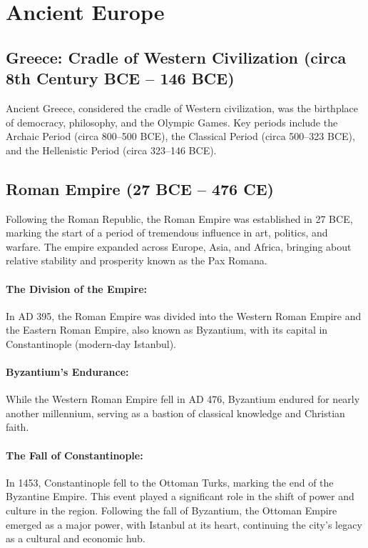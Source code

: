\documentclass{book}
\begin{document}
\section{Ancient Europe}
\label{sec:ancient-europe}
\subsection{Greece: Cradle of Western Civilization (circa 8th Century BCE – 146 BCE)}
Ancient Greece, considered the cradle of Western civilization, was the birthplace of democracy, philosophy, and the Olympic Games. Key periods include the Archaic Period (circa 800–500 BCE), the Classical Period (circa 500–323 BCE), and the Hellenistic Period (circa 323–146 BCE).

\subsection{Roman Empire (27 BCE – 476 CE)}
Following the Roman Republic, the Roman Empire was established in 27 BCE, marking the start of a period of tremendous influence in art, politics, and warfare. The empire expanded across Europe, Asia, and Africa, bringing about relative stability and prosperity known as the Pax Romana.

\paragraph{The Division of the Empire:}
In AD 395, the Roman Empire was divided into the Western Roman Empire and the Eastern Roman Empire, also known as Byzantium, with its capital in Constantinople (modern-day Istanbul).

\paragraph{Byzantium’s Endurance:}
While the Western Roman Empire fell in AD 476, Byzantium endured for nearly another millennium, serving as a bastion of classical knowledge and Christian faith.

\paragraph{The Fall of Constantinople:}
In 1453, Constantinople fell to the Ottoman Turks, marking the end of the Byzantine Empire. This event played a significant role in the shift of power and culture in the region. Following the fall of Byzantium, the Ottoman Empire emerged as a major power, with Istanbul at its heart, continuing the city’s legacy as a cultural and economic hub.
\end{document}
